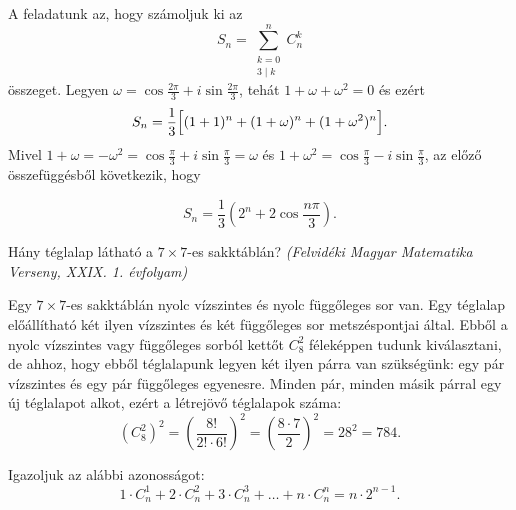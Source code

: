 \begin{solution}
A feladatunk az, hogy számoljuk ki az 
\[
S_{n}=\sum_{\substack{k=0\\
3\mid k
}
}^{n}C_{n}^{k}
\]
összeget. Legyen $\omega=\cos\frac{2\pi}{3}+i\sin\frac{2\pi}{3}$,
tehát $1+\omega+\omega^{2}=0$ és ezért 
\[
S_{n}=\frac{1}{3}\Bigl[(1+1)^{n}+(1+\omega)^{n}+(1+\omega^{2})^{n}\Bigr].
\]
Mivel $1+\omega=-\omega^{2}=\cos\frac{\pi}{3}+i\sin\frac{\pi}{3}=\omega$
és $1+\omega^{2}=\cos\frac{\pi}{3}-i\sin\frac{\pi}{3}$, az előző
összefüggésből következik, hogy

\[
S_{n}=\frac{1}{3}\left(2^{n}+2\cos\frac{n\pi}{3}\right).
\]
\end{solution}
\begin{extraproblem}
Hány téglalap látható a $7\times7$-es sakktáblán? \emph{(Felvidéki
Magyar Matematika Verseny, XXIX. 1. évfolyam)}
\end{extraproblem}

\begin{solution}
Egy $7\times7$-es sakktáblán nyolc vízszintes és nyolc függőleges
sor van. Egy téglalap előállítható két ilyen vízszintes és két függőleges
sor metszéspontjai által. Ebből a nyolc vízszintes vagy függőleges
sorból kettőt $C_{8}^{2}$ féleképpen tudunk kiválasztani, de ahhoz,
hogy ebből téglalapunk legyen két ilyen párra van szükségünk: egy
pár vízszintes és egy pár függőleges egyenesre. Minden pár, minden
másik párral egy új téglalapot alkot, ezért a létrejövő téglalapok
száma: 
\[
\left(C_{8}^{2}\right)^{2}=\left(\frac{8!}{2!\cdot6!}\right)^{2}=\left(\frac{8\cdot7}{2}\right)^{2}=28^{2}=784.
\]
\end{solution}
\begin{extraproblem}
Igazoljuk az alábbi azonosságot: 
\[
1\cdot C_{n}^{1}+2\cdot C_{n}^{2}+3\cdot C_{n}^{3}+\dots+n\cdot C_{n}^{n}=n\cdot2^{n-1}.
\]
\end{extraproblem}

